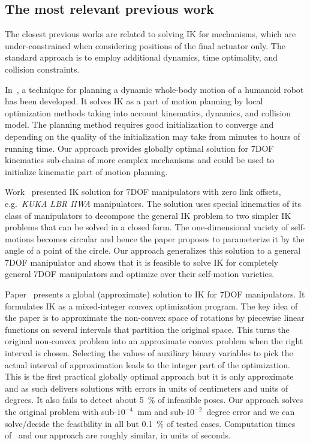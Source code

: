 \subsection{The most relevant previous work}
The closest previous works are related to solving IK for mechanisms, which are under-constrained when considering positions of the final actuator only. The standard approach is to employ additional dynamics, time optimality, and collision constraints.

In~\cite{Dai2014}, a technique for planning a dynamic whole-body motion of a humanoid robot has been developed. It solves IK as a part of motion planning by local optimization methods taking into account kinematics, dynamics, and collision model. The planning method requires good initialization to converge and depending on the quality of the initialization may take from minutes to hours of running time. Our approach provides globally optimal solution for 7DOF kinematics sub-chains of more complex mechanisms and could be used to initialize kinematic part of motion planning.

Work~\cite{Kuhlemann2016} presented IK solution for 7DOF manipulators with zero link offsets, e.g.\ \textit{KUKA LBR IIWA} manipulators. The solution uses special kinematics of its class of manipulators to decompose the general IK problem to two simpler IK problems that can be solved in a closed form. The one-dimensional variety of self-motions becomes circular and hence the paper proposes to parameterize it by the angle of a point of the circle. Our approach generalizes this solution to a general 7DOF manipulator and shows that it is feasible to solve IK for completely general 7DOF manipulators and optimize over their self-motion varieties.

Paper~\cite{Dai2019} presents a global (approximate) solution to IK for 7DOF manipulators. It formulates IK as a mixed-integer convex optimization program. The key idea of the paper is to approximate the non-convex space of rotations by piecewise linear functions on several intervals that partition the original space. This turns the original non-convex problem into an approximate convex problem when the right interval is chosen. Selecting the values of auxiliary binary variables to pick the actual interval of approximation leads to the integer part of the optimization. This is the first practical globally optimal approach but it is only approximate and as such delivers solutions with errors in units of centimeters and units of degrees. It also fails to detect about 5~\% of infeasible poses. Our approach solves the original problem with sub-$10^{-4}$~mm and sub-$10^{-2}$~degree error and we can solve/decide the feasibility in all but 0.1~\% of tested cases. Computation times of~\cite{Dai2019} and our approach are roughly similar, in units of seconds.

